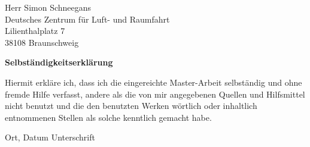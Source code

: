 \documentclass[11pt,DIV12,BCOR0mm,twoside,openright,headings=normal,%
  numbers=noenddot,headsepline,headinclude]{scrreprt}
\begin{document}
\vspace*{.5\baselineskip}
\noindent
Herr Simon Schneegans\\
Deutsches Zentrum für Luft- und Raumfahrt\\
Lilienthalplatz 7\\
38108 Braunschweig


\vfill
\noindent
{\sffamily\bfseries Selbständigkeitserklärung}

\vspace*{.5\baselineskip}
\noindent
Hiermit erkläre ich, dass ich die eingereichte Master-Arbeit selbständig und ohne fremde Hilfe verfasst, andere als die von mir angegebenen Quellen und Hilfsmittel nicht benutzt und die den benutzten Werken wörtlich oder inhaltlich entnommenen Stellen als solche kenntlich gemacht habe.

\vspace*{3\baselineskip}
\noindent
Ort, Datum\hspace{5cm} Unterschrift
\tableofcontents

\cleardoublepage
{}





\appendix



\printbibliography
\end{document}
